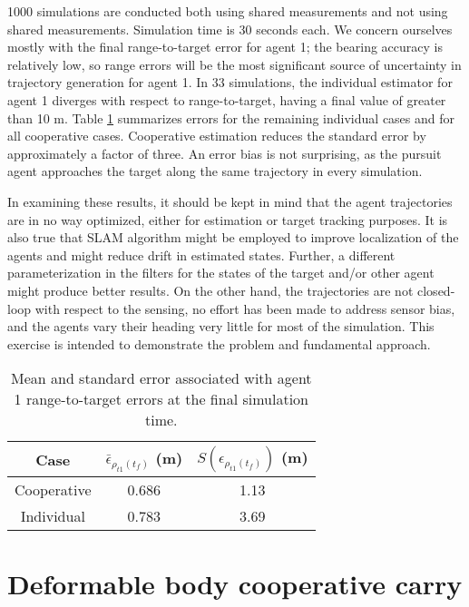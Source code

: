 \documentclass{aiaa-tc}
\begin{document}
1000 simulations are conducted both using shared measurements and not using shared measurements. Simulation time is 30 seconds each. We concern ourselves mostly with the final range-to-target error for agent 1; the bearing accuracy is relatively low, so range errors will be the most significant source of uncertainty in trajectory generation for agent 1. In 33 simulations, the individual estimator for agent 1 diverges with respect to range-to-target, having a final value of greater than 10 m. Table \ref{tab:mean_std_errs} summarizes errors for the remaining individual cases and for all cooperative cases. Cooperative estimation reduces the standard error by approximately a factor of three. An error bias is not surprising, as the pursuit agent approaches the target along the same trajectory in every simulation.

In examining these results, it should be kept in mind that the agent trajectories are in no way optimized, either for estimation or target tracking purposes. It is also true that SLAM algorithm might be employed to improve localization of the agents and might reduce drift in estimated states. Further, a different parameterization in the filters for the states of the target and/or other agent might produce better results. On the other hand, the trajectories are not closed-loop with respect to the sensing, no effort has been made to address sensor bias, and the agents vary their heading very little for most of the simulation. This exercise is intended to demonstrate the problem and fundamental approach.

\begin{table}
\centering
\begin{tabular}{|c|c|c|}
\hline
Case & $\bar{\epsilon}_{\rho_{t1}(t_f)}$ (m) &  $S(\epsilon_{\rho_{t1}(t_f)})$ (m)\\
\hline
Cooperative & 0.686 & 1.13\\
\hline
Individual & 0.783 & 3.69\\
\hline
\end{tabular}
\caption{Mean and standard error associated with agent 1 range-to-target errors at the final simulation time.}
\label{tab:mean_std_errs}
\end{table}

\section{Deformable body cooperative carry}
\end{document}
